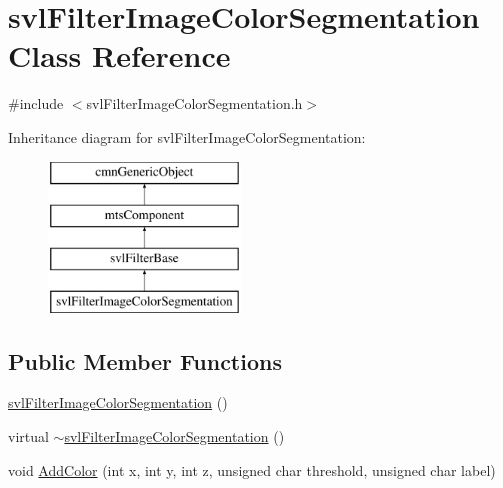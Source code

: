 \hypertarget{classsvl_filter_image_color_segmentation}{}\section{svl\+Filter\+Image\+Color\+Segmentation Class Reference}
\label{classsvl_filter_image_color_segmentation}


{\ttfamily \#include $<$svl\+Filter\+Image\+Color\+Segmentation.\+h$>$}

Inheritance diagram for svl\+Filter\+Image\+Color\+Segmentation\+:\begin{figure}[H]
\begin{center}
\leavevmode
\includegraphics[height=4.000000cm]{df/da7/classsvl_filter_image_color_segmentation}
\end{center}
\end{figure}
\subsection*{Public Member Functions}
\begin{DoxyCompactItemize}
\item 
\hyperlink{classsvl_filter_image_color_segmentation_a87d109901658f2ea1d71d4d2099573a1}{svl\+Filter\+Image\+Color\+Segmentation} ()
\item 
virtual \hyperlink{classsvl_filter_image_color_segmentation_a22ba4766caf53a58d90adf609e85cbac}{$\sim$svl\+Filter\+Image\+Color\+Segmentation} ()
\item 
void \hyperlink{classsvl_filter_image_color_segmentation_aaeadd40f3ebef72f823cef9f1974e600}{Add\+Color} (int x, int y, int z, unsigned char threshold, unsigned char label)
\end{DoxyCompactItemize}
